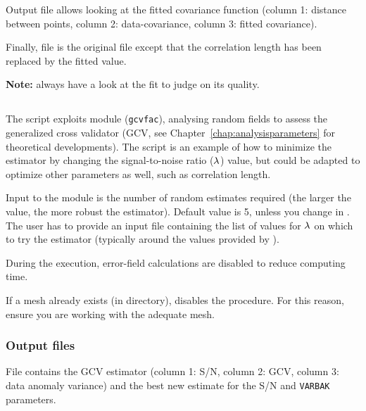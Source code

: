 Output file  allows looking at the fitted covariance function (column 1: distance between points, 
column 2: data-covariance, column 3: fitted covariance).

Finally, file  is the original  file except that the correlation length has been replaced by the fitted value. 

\textbf{Note:} always have a look at the fit to judge on its quality. %

\subsection{}

The script  exploits \diva module (\texttt{gcvfac}), analysing random fields to assess the generalized cross validator (GCV, see Chapter~\ref{chap:analysisparameters} for theoretical developments). The script  is an example of how to minimize the estimator by changing the signal-to-noise ratio ($\lambda$) value, but could be adapted to optimize other parameters as well, such as correlation length.

Input to the module is the number of random estimates required (the larger the value, the more robust the estimator). Default value is 5, unless you change in . The user has to provide an input file  containing the list of values for $\lambda$ on which to try the estimator (typically around the values provided by ).

During the  execution, error-field calculations are disabled to reduce computing time. 

\btips
If a mesh already exists (in  directory),  disables the  procedure. For this reason, ensure you are working with the adequate mesh.
\etips

\subsubsection{Output files}

File  contains the GCV estimator (column 1: S/N, column 2: GCV, column 3: data anomaly variance) and  the best new estimate for the S/N and \texttt{VARBAK} parameters.

